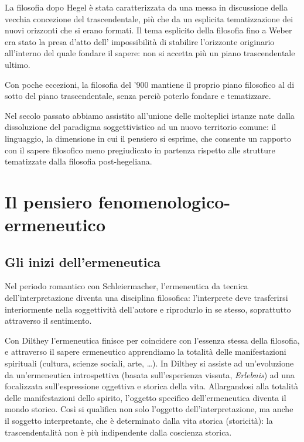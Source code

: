 La filosofia dopo Hegel è stata caratterizzata
da una messa in discussione della vecchia concezio­ne del trascendentale, più che da un esplicita
tematizzazione dei nuovi orizzonti che si erano
formati. Il tema esplicito della filosofia
fino a Weber era stato la presa d'atto dell'
impossibilità di stabilire l'orizzonte originario
all'interno del quale fondare il sapere: non si
accetta più un piano trascendentale ultimo.

Con poche eccezioni, la filosofia del '900
mantiene il proprio piano filosofico al di sotto
del piano trascendentale, senza perciò poterlo
fondare e tematizzare.

Nel secolo passato abbiamo assistito all'unione
delle molteplici istanze nate dalla dissoluzione
del paradigma soggettivistico ad un nuovo
territorio comune: il linguaggio, la dimensione
in cui il pensiero si esprime, che consente
un rapporto con il sapere filosofico meno pregiudicato in partenza rispetto alle strutture tematizzate dalla filosofia post-hegeliana.

\chapter{Il pensiero fenomenologico-ermeneutico}
\bigskip
\bigskip
\section{Gli inizi dell'ermeneutica}

Nel periodo romantico con Schleiermacher,
l'ermeneutica da tecnica dell'interpretazione diventa  una disciplina filosofica: l'interprete deve
trasferirsi interiormente nella soggettività dell'autore e riprodurlo in se stesso, soprattutto
attraverso il sentimento.

Con Dilthey l'ermeneutica finisce per coincidere
con l'essenza stessa della filosofia, e attraverso
il sapere ermeneutico apprendiamo la totalità delle
manifestazioni spirituali (cultura, scienze sociali, arte, \dots).
In Dilthey si assiste ad un'evoluzione da un'ermeneutica introspettiva (basata sull'esperienza
vissuta, \textit{Erlebnis}) ad una focalizzata sull'espressione oggettiva e storica della vita.
Allargandosi alla totalità delle manifestazioni
dello spirito, l'oggetto specifico dell'ermeneutica
diventa il mondo storico.
Così si qualifica non solo l'oggetto dell'interpretazione,
ma anche il soggetto interpretante, che è determinato dalla vita storica (storicità): la trascendentalità non è più indipendente dalla coscienza
storica.

